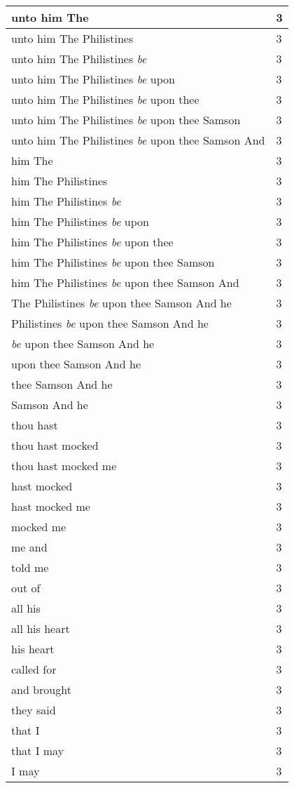 \begin{center}
\begin{longtable}{|p{3.0in}|p{0.5in}|}
unto him The & 3\\ \hline 
unto him The Philistines & 3\\ \hline 
unto him The Philistines \emph{be} & 3\\ \hline 
unto him The Philistines \emph{be} upon & 3\\ \hline 
unto him The Philistines \emph{be} upon thee & 3\\ \hline 
unto him The Philistines \emph{be} upon thee Samson & 3\\ \hline 
unto him The Philistines \emph{be} upon thee Samson And & 3\\ \hline 
him The & 3\\ \hline 
him The Philistines & 3\\ \hline 
him The Philistines \emph{be} & 3\\ \hline 
him The Philistines \emph{be} upon & 3\\ \hline 
him The Philistines \emph{be} upon thee & 3\\ \hline 
him The Philistines \emph{be} upon thee Samson & 3\\ \hline 
him The Philistines \emph{be} upon thee Samson And & 3\\ \hline 
The Philistines \emph{be} upon thee Samson And he & 3\\ \hline 
Philistines \emph{be} upon thee Samson And he & 3\\ \hline 
\emph{be} upon thee Samson And he & 3\\ \hline 
upon thee Samson And he & 3\\ \hline 
thee Samson And he & 3\\ \hline 
Samson And he & 3\\ \hline 
thou hast & 3\\ \hline 
thou hast mocked & 3\\ \hline 
thou hast mocked me & 3\\ \hline 
hast mocked & 3\\ \hline 
hast mocked me & 3\\ \hline 
mocked me & 3\\ \hline 
me and & 3\\ \hline 
told me & 3\\ \hline 
out of & 3\\ \hline 
all his & 3\\ \hline 
all his heart & 3\\ \hline 
his heart & 3\\ \hline 
called for & 3\\ \hline 
and brought & 3\\ \hline 
they said & 3\\ \hline 
that I & 3\\ \hline 
that I may & 3\\ \hline 
I may & 3\\ \hline 
\end{longtable}
\end{center}





